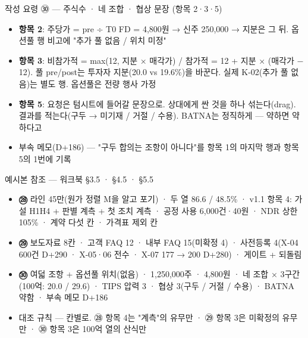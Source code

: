 \begin{frame}{작성 요령 ㉚ — 주식수 · 네 조합 · 협상 문장 (항목 2·3·5)}
\begin{itemize}
\item \textbf{항목 2}: 주당가 = pre ÷ T0 FD = 4,800원 → 신주 250,000 → 지분은 그 뒤. 옵션풀 행 비고에 "추가 풀 없음 / 위치 미정"
\item \textbf{항목 3}: 비참가적 = max(12, 지분 × 매각가) / 참가적 = 12 + 지분 × (매각가 $-$ 12). 풀 pre/post는 투자자 지분(20.0 vs 19.6\%)을 바꾼다. 실제 K-02(추가 풀 없음)는 별도 행. 옵션풀은 전량 행사 가정
\item \textbf{항목 5}: 요청은 텀시트에 들어갈 문장으로. 상대에게 싼 것을 하나 섞는다(drag). 결과를 적는다(구두 → 미기재 / 거절 / 수용). BATNA는 정직하게 — 약하면 약하다고
\item 부속 메모(D+186) — "구두 합의는 조항이 아니다"를 항목 1의 마지막 행과 항목 5의 1번에 기록
\end{itemize}
\end{frame}

\begin{frame}{예시본 참조 — 워크북 §3.5 · §4.5 · §5.5}
\begin{itemize}
\item \textbf{㉘} 라인 45만(원가 정렬 M을 알고 포기) · 두 열 86.6 / 48.5\% · v1.1 항목 4: 가설 H1\til{}H4 + 판별 계측 + 첫 조치 계측 · 공정 사용 6,000건·40원 · NDR 상한 105\% · 계약 다섯 칸 · 가격표 제외 칸
\item \textbf{㉙} 보도자료 8칸 · 고객 FAQ 12 · 내부 FAQ 15(미확정 4) · 사전등록 4(X-04 600건 D+290 · X-05·06 전수 · X-07 177 → 200 D+280) · 게이트 + 되돌림
\item \textbf{㉚} 여덟 조항 + 옵션풀 위치(없음) · 1,250,000주 · 4,800원 · 네 조합 × 3구간(100억: 20.0 / 29.6) · TIPS 압력 3 · 협상 3(구두 / 거절 / 수용) · BATNA 약함 · 부속 메모 D+186
\item 대조 규칙 — 칸별로. ㉘ 항목 4는 "계측"의 유무만 · ㉙ 항목 3은 미확정의 유무만 · ㉚ 항목 3은 100억 열의 산식만
\end{itemize}
\end{frame}

